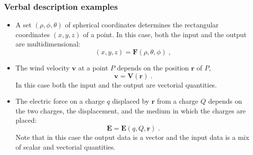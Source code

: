 \begin{frame}\frametitle{Verbal description examples}
\begin{itemize}

  \item A set $(\rho, \phi, \theta)$ of spherical
  coordinates determines the rectangular coordinates
  $(x,y,z)$ of a point. In this case, both the input
  and the output are multidimensional:
  $$(x,y,z) = \textbf{F}(\rho, \theta, \phi)\; ,$$

  \item The wind velocity $\textbf{v}$ at a point $P$
  depends on the position $\textbf{r}$ of $P$,
  $$\textbf{v} = \textbf{V} (\textbf{r})\; .$$
  In this case both the input and the output are
  vectorial quantities.

  \item The electric force on a charge $q$ displaced
  by $\textbf{r}$ from a charge $Q$ depends on the
  two charges, the displacement, and the medium in
  which the charges are placed:
  $$\textbf{E} =
  \textbf{E}(q, Q,\textbf{r})\; .$$
  Note that in this case the output data
  is a vector and the input data is a mix of scalar
  and vectorial quantities.
\end{itemize}

\vskip 8cm %

\end{frame}